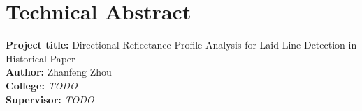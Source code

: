 
\section*{Technical Abstract}

\noindent\textbf{Project title:} Directional Reflectance Profile Analysis for Laid-Line Detection in Historical Paper\\
\textbf{Author:} Zhanfeng Zhou\\
\textbf{College:} \emph{TODO}\\
\textbf{Supervisor:} \emph{TODO}\\[0.5em]

%
%
%
